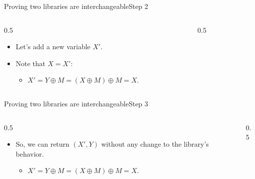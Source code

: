 \ifdefined\PRESENTATION\else\PassOptionsToClass{handout}{beamer}\fi\documentclass[aspectratio=169, lualatex]{beamer}
\begin{document}
\begin{frame}{Proving two libraries are interchangeable}{Step 2}
	\begin{columns}[c]
		\begin{column}{0.5\textwidth}
			\begin{itemize}
				\item Let's add a new variable $X'$.
				\item Note that $X = X'$:
				      \begin{itemize}
					      \item $X' = Y \oplus M = (X \oplus M) \oplus M = X$.
				      \end{itemize}
			\end{itemize}
		\end{column}
		\begin{column}{0.5\textwidth}
			\begin{center}
			\end{center}
		\end{column}
	\end{columns}
\end{frame}

\begin{frame}{Proving two libraries are interchangeable}{Step 3}
	\begin{columns}[c]
		\begin{column}{0.5\textwidth}
			\begin{itemize}
				\item So, we can return $(X', Y)$ without any change to the library's behavior.
				      \begin{itemize}
					      \item $X' = Y \oplus M = (X \oplus M) \oplus M = X$.
				      \end{itemize}
			\end{itemize}
		\end{column}
		\begin{column}{0.5\textwidth}
			\begin{center}
			\end{center}
		\end{column}
	\end{columns}
\end{frame}
\end{document}
